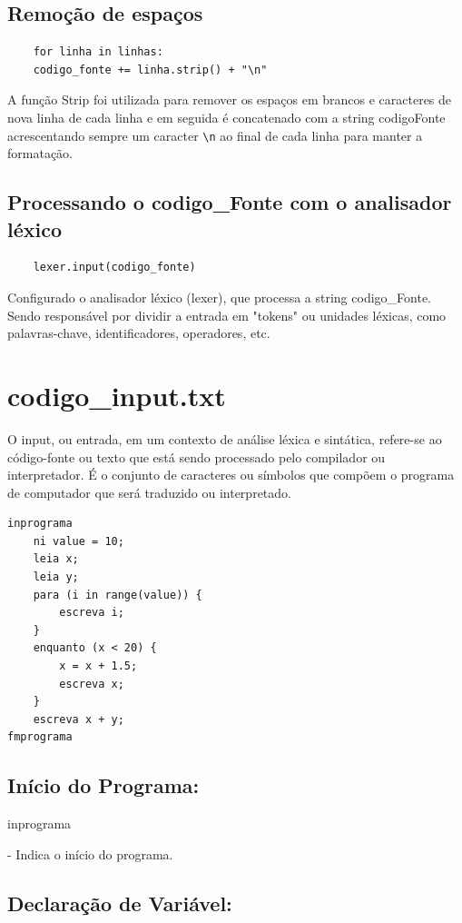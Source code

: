 \documentclass[a4paper,12pt]{article}
\begin{document}
\subsection{Remoção de espaços}
\begin{verbatim}
    for linha in linhas:
    codigo_fonte += linha.strip() + "\n"

\end{verbatim}
A função Strip foi utilizada para remover os espaços em brancos e 
caracteres de nova linha de cada linha e em seguida é concatenado com a 
string codigoFonte acrescentando sempre um caracter 
\texttt{\textbackslash n} ao final de cada linha para manter a 
formatação.

\subsection{Processando o codigo\_Fonte com o analisador léxico}
\begin{verbatim}
    lexer.input(codigo_fonte)
\end{verbatim}
Configurado o analisador léxico (lexer), que processa a string 
codigo\_Fonte. Sendo responsável por dividir a entrada em "tokens" ou 
unidades léxicas, como palavras-chave, identificadores, operadores, etc.

\section{codigo\_input.txt}
O input, ou entrada, em um contexto de análise léxica e sintática, 
refere-se ao código-fonte ou texto que está sendo processado pelo 
compilador ou interpretador. É o conjunto de caracteres ou símbolos que 
compõem o programa de computador que será traduzido ou interpretado.

\begin{verbatim}
inprograma
    ni value = 10;
    leia x;
    leia y;
    para (i in range(value)) {
        escreva i;
    }
    enquanto (x < 20) {
        x = x + 1.5;
        escreva x;
    }
    escreva x + y;
fmprograma
\end{verbatim}

\subsection{Início do Programa:}
    inprograma
  
    - Indica o início do programa.
\\
\subsection{Declaração de Variável:}
\end{document}
